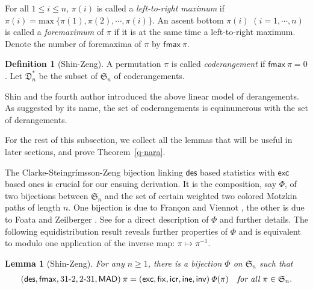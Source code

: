\documentclass[12pt,reqno]{amsart}
\numberwithin{equation}{section}
\theoremstyle{plain}
\newtheorem{lemma}[theorem]{Lemma}
\theoremstyle{definition}
\newtheorem{Def}[theorem]{Definition}
\def\S{\mathfrak{S}}
\def\D{\mathfrak{D}}
\def\exc{\mathsf{exc}}
\def\des{\mathsf{des}}
\def\inv{\mathsf{inv}}
\def\fix{\mathsf{fix}}
\def\fmax{\mathsf{fmax}}
\def\icr{\mathsf{icr}}
\def\ine{\mathsf{ine}}
\def\MAD{\mathsf{MAD}}
\def\cab{31\text{-}2}
\def\bca{2\text{-}31}
\begin{document}
For all $1\leq i\leq n$, $\pi(i)$ is called a {\em left-to-right maximum} if $\pi(i)=\textrm{max}\:\{\pi(1),\pi(2),\cdots,\pi(i)\}$. An ascent bottom $\pi(i)$ $(i=1, \cdots, n)$ is called a \emph{foremaximum} of $\pi$ if it is at the same time a left-to-right maximum. Denote the number of foremaxima of $\pi$ by $\fmax\:\pi$.

\begin{Def}[Shin-Zeng]\label{coderange}
A permutation $\pi$ is called {\em coderangement} if $\fmax\:\pi=0$. Let $\D^*_n$ be the subset of $\S_n$ of coderangements.
\end{Def}
Shin and the fourth author \cite[Definition~7]{SZ10} introduced the above linear model of derangements. As suggested by its name, the set of coderangements is equinumerous with the set of derangements.

For the rest of this subsection, we collect all the lemmas that will be useful in later sections, and prove Theorem~\ref{q-nara}.

The Clarke-Steingr\'imsson-Zeng bijection \cite{CSZ} linking $\des$ based statistics with $\exc$ based ones is crucial for our ensuing derivation. It is the composition, say $\varPhi$, of two bijections between $\S_n$ and the set of certain weighted two colored Motzkin paths of length $n$. One bijection is due to Fran\c con and Viennot \cite{FV}, the other is due to Foata and Zeilberger \cite{FZ}. See \cite{CSZ} for a direct description of $\varPhi$ and further details.  The following equidistribution result reveals further properties of $\varPhi$ and is equivalent to \cite[Theorem~8]{SZ10} modulo one application of the inverse map: $\pi\mapsto \pi^{-1}$.
\begin{lemma}[Shin-Zeng]\label{quintuple:des-exc}
For any $n\ge 1$, there is a bijection $\varPhi$ on $\S_n$ such that
\begin{align*}
(\des,\fmax,\cab,\bca,\MAD)\:\pi=(\exc,\fix,\icr,\ine,\inv)\:\varPhi(\pi)\quad \emph{for all }\pi\in\S_n.
\end{align*}
\end{lemma}
\end{document}
